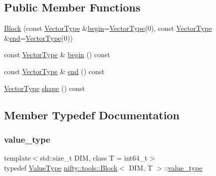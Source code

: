 \subsection*{Public Member Functions}
\begin{DoxyCompactItemize}
\item 
\hyperlink{classnifty_1_1tools_1_1Block_ab4fe7e24f2d3cd64b75a4e58b314170e}{Block} (const \hyperlink{classnifty_1_1tools_1_1Block_aa077b4ebbf3e4e9b679d1957ca10ba32}{Vector\+Type} \&\hyperlink{classnifty_1_1tools_1_1Block_ac7e8b2af42afe467226831c9c68301e9}{begin}=\hyperlink{classnifty_1_1tools_1_1Block_aa077b4ebbf3e4e9b679d1957ca10ba32}{Vector\+Type}(0), const \hyperlink{classnifty_1_1tools_1_1Block_aa077b4ebbf3e4e9b679d1957ca10ba32}{Vector\+Type} \&\hyperlink{classnifty_1_1tools_1_1Block_a60b2b16eb9dadb0878e7b025e2840e06}{end}=\hyperlink{classnifty_1_1tools_1_1Block_aa077b4ebbf3e4e9b679d1957ca10ba32}{Vector\+Type}(0))
\item 
const \hyperlink{classnifty_1_1tools_1_1Block_aa077b4ebbf3e4e9b679d1957ca10ba32}{Vector\+Type} \& \hyperlink{classnifty_1_1tools_1_1Block_ac7e8b2af42afe467226831c9c68301e9}{begin} () const
\item 
const \hyperlink{classnifty_1_1tools_1_1Block_aa077b4ebbf3e4e9b679d1957ca10ba32}{Vector\+Type} \& \hyperlink{classnifty_1_1tools_1_1Block_a60b2b16eb9dadb0878e7b025e2840e06}{end} () const
\item 
\hyperlink{classnifty_1_1tools_1_1Block_aa077b4ebbf3e4e9b679d1957ca10ba32}{Vector\+Type} \hyperlink{classnifty_1_1tools_1_1Block_ac4b21e3bd06fbdb886dc7ad30ed31000}{shape} () const
\end{DoxyCompactItemize}


\subsection{Member Typedef Documentation}
\mbox{\label{classnifty_1_1tools_1_1Block_accbed9defe9a82425025d9182c41e0a6}} 
\subsubsection{\texorpdfstring{value\+\_\+type}{value\_type}}
{\footnotesize\ttfamily template$<$std\+::size\+\_\+t D\+IM, class T  = int64\+\_\+t$>$ \\
typedef \hyperlink{classnifty_1_1tools_1_1Block_a3e77342701a32fcc670d398f1b9bc6d4}{Value\+Type} \hyperlink{classnifty_1_1tools_1_1Block}{nifty\+::tools\+::\+Block}$<$ D\+IM, T $>$\+::\hyperlink{classnifty_1_1tools_1_1Block_accbed9defe9a82425025d9182c41e0a6}{value\+\_\+type}}




